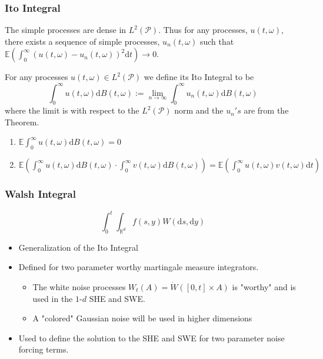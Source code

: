 \documentclass[11pt]{beamer}
\numberwithin{equation}{section}
\newcommand{\R}{\mathbb{R}}
\newcommand{\E}{\mathbb{E}}
\newcommand{\ud}{\ensuremath{\mathrm{d}}}
\begin{document}
\begin{frame}[t]
	\frametitle{Ito Integral}
\begin{theorem}
	The simple processes are dense in $L^2(\mathscr{P})$. Thus for any processes, $u(t,\omega)$, there exists a sequence of simple processes, $u_n(t,\omega)$ such that $\E \left( \int_0^\infty (u(t,\omega) - u_n(t,\omega))^2 \ud t \right) \to 0$.
\end{theorem}

\begin{definition}
	For any processes $u(t,\omega) \in L^2(\mathscr{P})$ we define its Ito Integral to be
	\[\int_0^\infty u(t,\omega) \ud B(t,\omega) := \lim_{n \to \infty} \int_0^\infty u_n(t,\omega) \ud B(t, \omega)
	\]
	where the limit is with respect to the $L^2(\mathscr{P})$ norm and the $u_n's$ are from the Theorem.
\end{definition}

\begin{theorem}
	\begin{enumerate}
		\item $ \E \int_0^\infty u(t,\omega) \ud B(t,\omega) = 0$
		\item $ \E\left( \int_0^\infty u(t,\omega) \ud B(t,\omega)\cdot \int_0^\infty v(t,\omega) \ud B(t,\omega) \right) = \E \left( \int_0^\infty u(t,\omega)v(t,\omega) \ud t \right) $
	\end{enumerate}
\end{theorem}
\end{frame}

\begin{frame}[t]
	\frametitle{Walsh Integral}
	\[
		\int_0^t\int_{\R^d}f(s,y)W(\ud s, \ud y) 
	\]
\begin{itemize}
	\item Generalization of the Ito Integral
	\item Defined for two parameter worthy martingale measure integrators.
		\begin{itemize}
			\item The white noise processes $	W_t(A) = \dot{W}([0,t] \times A)$ is "worthy" and is used in the $1$-$d$ SHE and SWE. 
			\item A "colored" Gaussian noise will be used in higher dimensions
		\end{itemize}  
	\item Used to define the solution to the SHE and SWE for two parameter noise forcing terms. 
\end{itemize}

\end{frame}
\end{document}
